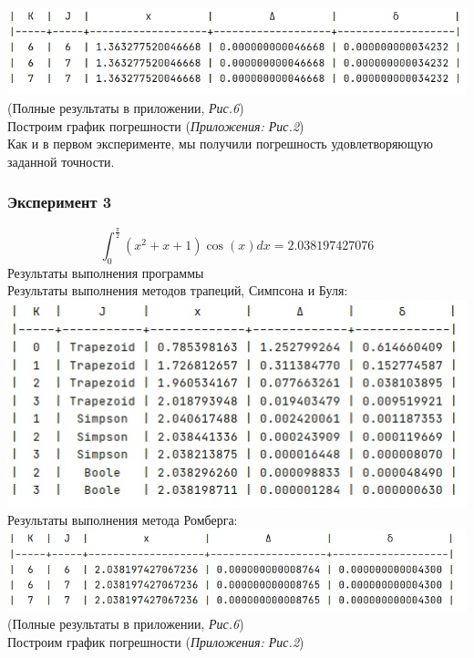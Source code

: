 \documentclass[14pt, titlepage, a4paper]{extarticle} %
\begin{document}
	\includegraphics[width=400pt]{fr2.jpeg}\\
	(Полные результаты в приложении, \textit{Рис.6})
	~\\
	Построим график погрешности (\textit{Приложения: Рис.2})
	\\
	Как и в первом эксперименте, мы получили погрешность удовлетворяющую заданной точности.
	
	

	\subsubsection*{Эксперимент 3}
	
	\[\int_{0}^{\frac{\pi}{2}}\left(x^2 + x + 1\right)\cos(x)dx = 2.038197427076\]
	Результаты выполнения программы
	~\\
	Результаты выполнения методов трапеций, Симпсона и Буля:
	~\\
	
	\includegraphics[width=400pt]{f3.jpeg}
	\\
	Результаты выполнения метода Ромберга:
	~\\
	
	\includegraphics[width=400pt]{fr3.jpeg}\\
	(Полные результаты в приложении, \textit{Рис.6})
	~\\
	Построим график погрешности (\textit{Приложения: Рис.2})
	
\end{document}
